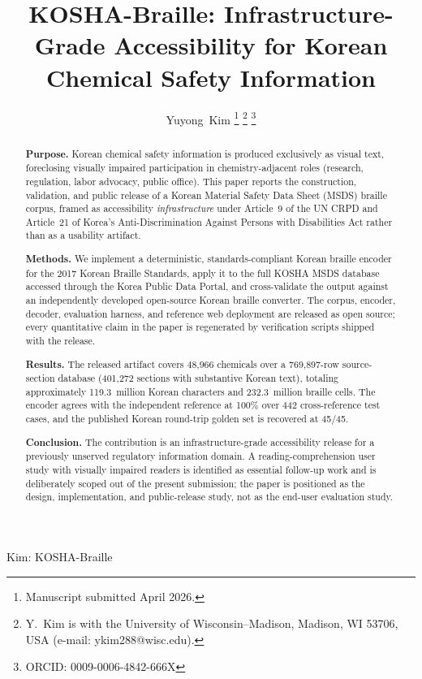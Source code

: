 \documentclass[journal]{IEEEtran}
\begin{document}
\title{KOSHA-Braille: Infrastructure-Grade Accessibility for Korean Chemical Safety Information}

\author{Yuyong~Kim
\thanks{Manuscript submitted April 2026.}
\thanks{Y.~Kim is with the University of Wisconsin--Madison, Madison, WI 53706, USA (e-mail: ykim288@wisc.edu).}
\thanks{ORCID: 0009-0006-4842-666X}
}

{Kim: KOSHA-Braille}

\begin{abstract}
\textbf{Purpose.} Korean chemical safety information is produced exclusively as visual text, foreclosing visually impaired participation in chemistry-adjacent roles (research, regulation, labor advocacy, public office). This paper reports the construction, validation, and public release of a Korean Material Safety Data Sheet (MSDS) braille corpus, framed as accessibility \emph{infrastructure} under Article~9 of the UN CRPD and Article~21 of Korea's Anti-Discrimination Against Persons with Disabilities Act rather than as a usability artifact.

\textbf{Methods.} We implement a deterministic, standards-compliant Korean braille encoder for the 2017 Korean Braille Standards, apply it to the full KOSHA MSDS database accessed through the Korea Public Data Portal, and cross-validate the output against an independently developed open-source Korean braille converter. The corpus, encoder, decoder, evaluation harness, and reference web deployment are released as open source; every quantitative claim in the paper is regenerated by verification scripts shipped with the release.

\textbf{Results.} The released artifact covers 48{,}966 chemicals over a 769{,}897-row source-section database (401{,}272 sections with substantive Korean text), totaling approximately 119.3~million Korean characters and 232.3~million braille cells. The encoder agrees with the independent reference at 100\% over 442 cross-reference test cases, and the published Korean round-trip golden set is recovered at 45/45.

\textbf{Conclusion.} The contribution is an infrastructure-grade accessibility release for a previously unserved regulatory information domain. A reading-comprehension user study with visually impaired readers is identified as essential follow-up work and is deliberately scoped out of the present submission; the paper is positioned as the design, implementation, and public-release study, not as the end-user evaluation study.
\end{abstract}
\end{document}
